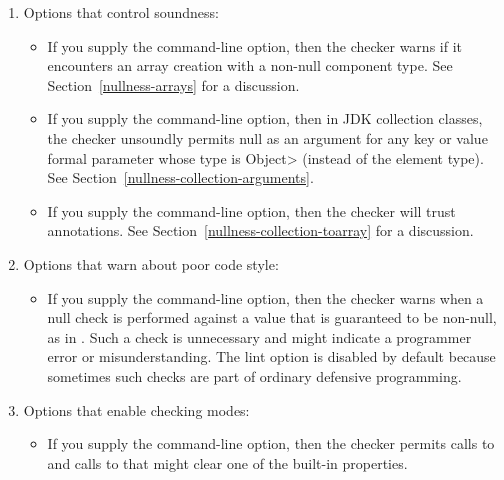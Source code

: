\begin{enumerate}
\item
  Options that control soundness:

\begin{itemize}
\item
  \label{nullness-lint-soundArrayCreationNullness}%
  \label{nullness-lint-nonnullarraycomponents}%
  If you supply the  command-line
  option, then the checker warns if it encounters an array creation
  with a non-null component type.
  See Section~\ref{nullness-arrays} for a discussion.

\item
  \label{collection-object-parameters-may-be-null}
  If you supply the
  command-line option, then in JDK collection classes, the checker
  unsoundly permits null as an argument for any key or value formal
  parameter whose type is \<Object> (instead of the element type).
  See Section~\ref{nullness-collection-arguments}.

\item
  \label{nullness-lint-trustarraylenzero}%
  If you supply the  command-line option, then
  the checker will trust 
  annotations. See Section~\ref{nullness-collection-toarray} for a discussion.
\end{itemize}

\item
  Options that warn about poor code style:

\begin{itemize}
\item
  \label{nullness-lint-nulltest}%
  If you supply the  command-line option, then the
  checker warns when a null check is performed against a value that is
  guaranteed to be non-null, as in .  Such a check is
  unnecessary and might indicate a programmer error or misunderstanding.
  The lint option is disabled by default because sometimes such checks are
  part of ordinary defensive programming.
\end{itemize}

\item
  Options that enable checking modes:

\begin{itemize}
\item
  If you supply the  command-line option,
  then the checker permits calls to
  and calls to
  that might clear one of the built-in properties.


\end{itemize}
\end{enumerate}
